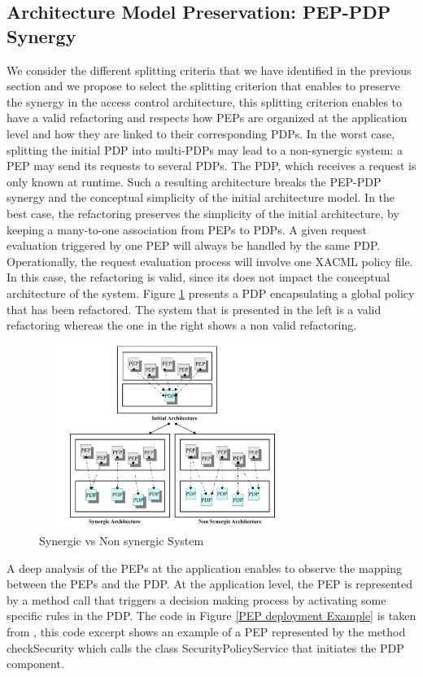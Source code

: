 
\subsection{Architecture Model Preservation: PEP-PDP Synergy}
We consider the different splitting criteria that we have identified in the previous section and we propose to select the splitting criterion that 
enables to preserve the synergy in the access control architecture, this splitting criterion enables to have a valid refactoring and respects how PEPs are organized 
at the application level and how they are linked to their corresponding PDPs.
In the worst case, splitting the initial PDP into multi-PDPs may lead to a non-synergic system: a PEP may send its requests to several PDPs. 
The PDP, which receives a request is only known at runtime. Such a resulting architecture breaks the PEP-PDP synergy and the conceptual 
simplicity of the initial architecture model. In the best case, the refactoring preserves the simplicity of the initial architecture, by keeping a many-to-one association 
from PEPs to PDPs. A given request evaluation triggered by one PEP will always be handled by the same PDP. Operationally, the request evaluation process will involve 
one XACML policy file. In this case, the refactoring is valid, since its does not impact the conceptual architecture of the system.
Figure \ref{Synergic vs Non synergic System} presents a PDP encapsulating a global policy that has been refactored. The system that is presented in the left is a valid refactoring whereas 
the one in the right shows a non valid refactoring.
\begin{figure}[!h]
\begin{center}
\includegraphics[width=8.5cm, height=6cm]{synergic-nonsynergic}
\caption{Synergic vs Non synergic System}
\label{Synergic vs Non synergic System}
\end{center}
\end{figure}
A deep analysis of the PEPs at the application enables to observe the mapping between the PEPs and the PDP. At the application level, the PEP
is represented by a method call that triggers a decision making process by activating some specific rules in the PDP.
The code in Figure \ref{PEP deployment Example} is taken from \cite{legacy}, this code excerpt shows an example of a PEP represented by the method checkSecurity which calls the class 
SecurityPolicyService that initiates the PDP component.


